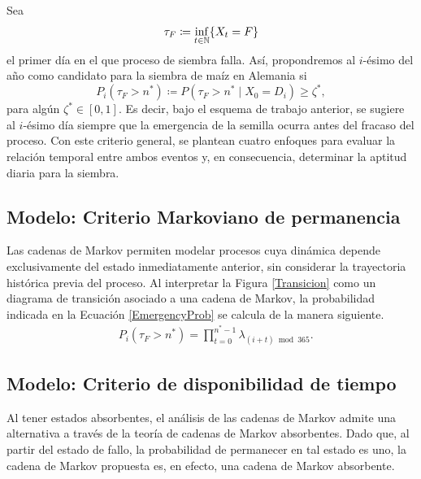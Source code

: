 Sea \begin{equation}
	\tau_{F}\coloneq\inf_{t\in\mathbb{N}}\{X_t=F\}
\end{equation} el primer día en el que proceso de siembra falla. Así, propondremos al $i$-ésimo del año como candidato para la siembra de maíz en Alemania si \begin{equation}\label{EmergencyProb}
	P_{i}(	\tau_{F} > n^* ) \coloneq 	P(	\tau_{F} > n^* \mid X_{0}=D_i )  \geq \zeta^*,
\end{equation}para algún $\zeta^*\in [0,1]$. Es decir, bajo el esquema de trabajo anterior, se sugiere al $i$-ésimo día siempre que la emergencia de la semilla ocurra antes del fracaso del proceso. Con este criterio general, se plantean cuatro enfoques para evaluar la relación temporal entre ambos eventos y, en consecuencia, determinar la aptitud diaria para la siembra.\\



\subsection{Modelo: Criterio Markoviano de permanencia}
Las cadenas de Markov permiten modelar procesos cuya dinámica depende exclusivamente del estado inmediatamente anterior, sin considerar la trayectoria histórica previa del proceso. Al interpretar la Figura \ref{Transicion} como un diagrama de transición asociado a una cadena de Markov, la probabilidad indicada en la Ecuación \eqref{EmergencyProb} se calcula de la manera siguiente.\\

 \begin{equation}
	\begin{aligned}
		&P_{i}(\tau_F>n^*)=\prod_{t=0}^{n^*-1} \lambda_{(i+t) \bmod{365}}.
	\end{aligned}
	\label{product_lambdas}
\end{equation}


\subsection{Modelo: Criterio de disponibilidad de tiempo}
Al tener estados absorbentes, el análisis de las cadenas de Markov admite una alternativa a través de la teoría de cadenas de Markov absorbentes. Dado que, al partir del estado de fallo, la probabilidad de permanecer en tal estado es uno, la cadena de Markov propuesta es, en efecto, una cadena de Markov absorbente.\\

